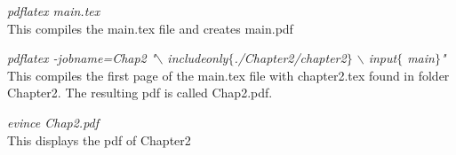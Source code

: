\documentclass[12pt]{article}
\begin{document}
\textit{pdflatex main.tex} \\
This compiles the main.tex file and creates main.pdf

\textit{pdflatex -jobname=Chap2 "$\backslash$ includeonly$\{$./Chapter2/chapter2$\}$ $\backslash$ input$\{$ main$\}$"} \\
This compiles the first page of the main.tex file with chapter2.tex found in folder Chapter2. The resulting pdf is called Chap2.pdf.

\textit{evince Chap2.pdf} \\
This displays the pdf of Chapter2
\end{document}

